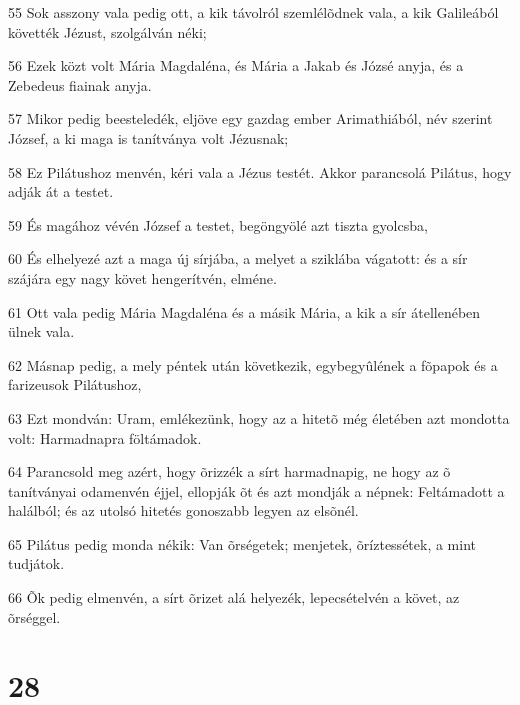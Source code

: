\par 55 Sok asszony vala pedig ott, a kik távolról szemlélõdnek vala, a kik Galileából követték Jézust, szolgálván néki;
\par 56 Ezek közt volt Mária Magdaléna, és Mária a Jakab és Józsé anyja, és a Zebedeus fiainak anyja.
\par 57 Mikor pedig beesteledék, eljöve egy gazdag ember Arimathiából, név szerint  József, a ki maga is tanítványa volt Jézusnak;
\par 58 Ez Pilátushoz menvén, kéri vala a Jézus testét. Akkor parancsolá Pilátus, hogy adják át a testet.
\par 59 És magához vévén József a testet, begöngyölé azt tiszta gyolcsba,
\par 60 És elhelyezé azt a maga új sírjába, a melyet a sziklába vágatott: és a sír szájára egy nagy követ hengerítvén, elméne.
\par 61 Ott vala pedig Mária Magdaléna és a másik Mária, a kik a sír átellenében ülnek vala.
\par 62 Másnap pedig, a mely péntek után következik, egybegyûlének a fõpapok és a farizeusok Pilátushoz,
\par 63 Ezt mondván: Uram, emlékezünk, hogy az a hitetõ még életében azt mondotta volt: Harmadnapra föltámadok.
\par 64 Parancsold meg azért, hogy õrizzék a sírt harmadnapig, ne hogy az õ tanítványai odamenvén éjjel, ellopják õt és azt mondják a népnek: Feltámadott a halálból; és az utolsó hitetés gonoszabb legyen az elsõnél.
\par 65 Pilátus pedig monda nékik: Van õrségetek; menjetek, õríztessétek, a mint tudjátok.
\par 66 Õk pedig elmenvén, a sírt õrizet alá helyezék, lepecsételvén a követ, az õrséggel.

\chapter{28}

